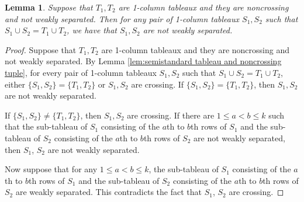 \documentclass[10pt,a4paper]{amsart}
\newtheorem{lemma}{Lemma}
\begin{document}
\begin{lemma} \label{lem:T1T2 non crossing and not weakly separated implies that if S1 S2 is T1 T2 then S1 S2 not weakly separated}
Suppose that $T_1, T_2$ are 1-column tableaux and they are noncrossing and not weakly separated. Then for any pair of 1-column tableaux $S_1, S_2$ such that $S_1 \cup S_2 = T_1 \cup T_2$, we have that $S_1, S_2$ are not weakly separated. 
\end{lemma}

\begin{proof}
Suppose that $T_1, T_2$ are 1-column tableaux and they are noncrossing and not weakly separated. By Lemma \ref{lem:semistandard tableau and noncrossing tuple}, for every pair of 1-column tableaux $S_1, S_2$ such that $S_1 \cup S_2 = T_1 \cup T_2$, either $\{S_1, S_2\} = \{T_1, T_2\}$ or $S_1, S_2$ are crossing. If $\{S_1, S_2\} = \{T_1, T_2\}$, then $S_1, S_2$ are not weakly separated. 

If $\{S_1, S_2\} \ne \{T_1, T_2\}$, then $S_1, S_2$ are crossing. If there are $1 \le a < b \le k$ such that the sub-tableau of $S_1$ consisting of the $a$th to $b$th rows of $S_1$ and the sub-tableau of $S_2$ consisting of the $a$th to $b$th rows of $S_2$ are not weakly separated, then $S_1$, $S_2$ are not weakly separated. 

Now suppose that for any $1 \le a < b \le k$, the sub-tableau of $S_1$ consisting of the $a$th to $b$th rows of $S_1$ and the sub-tableau of $S_2$ consisting of the $a$th to $b$th rows of $S_2$ are weakly separated. This contradicts the fact that $S_1$, $S_2$ are crossing.
\end{proof}
\end{document}
